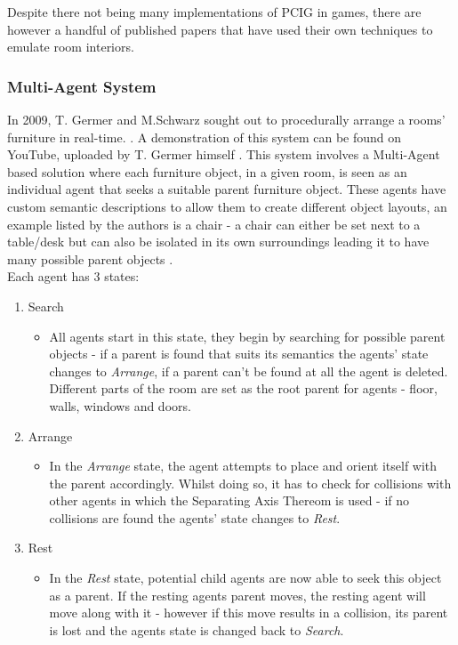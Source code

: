 Despite there not being many implementations of PCIG in games, there are however a handful of published papers that have used their own techniques to emulate room interiors.
\subsubsection*{Multi-Agent System}
In 2009, T. Germer and M.Schwarz sought out to procedurally arrange a rooms' furniture in real-time. \cite{real-time-walkthroughs}. A demonstration of this system can be found on YouTube, uploaded by T. Germer himself \cite{youtube:real-time-walkthroughs}. This system involves a Multi-Agent based solution where each furniture object, in a given room, is seen as an individual agent that seeks a suitable parent furniture object. These agents have custom semantic descriptions to allow them to create different object layouts, an example listed by the authors is a chair - a chair can either be set next to a table/desk but can also be isolated in its own surroundings leading it to have many possible parent objects \cite{real-time-walkthroughs}.\\
Each agent has 3 states:
\begin{enumerate}
    \item Search
        \begin{itemize}
            \item All agents start in this state, they begin by searching for possible parent objects - if a parent is found that suits its semantics the agents' state changes to \textit{Arrange}, if a parent can't be found at all the agent is deleted. Different parts of the room are set as the root parent for agents - floor, walls, windows and doors.
        \end{itemize}
    \item Arrange
        \begin{itemize}
            \item In the \textit{Arrange} state, the agent attempts to place and orient itself with the parent accordingly. Whilst doing so, it has to check for collisions with other agents in which the Separating Axis Thereom is used \cite{separating-axis-thereom} - if no collisions are found the agents' state changes to \textit{Rest}.
        \end{itemize}
    \item Rest
        \begin{itemize}
            \item In the \textit{Rest} state, potential child agents are now able to seek this object as a parent. If the resting agents parent moves, the resting agent will move along with it - however if this move results in a collision, its parent is lost and the agents state is changed back to \textit{Search}.
        \end{itemize}
\end{enumerate}

